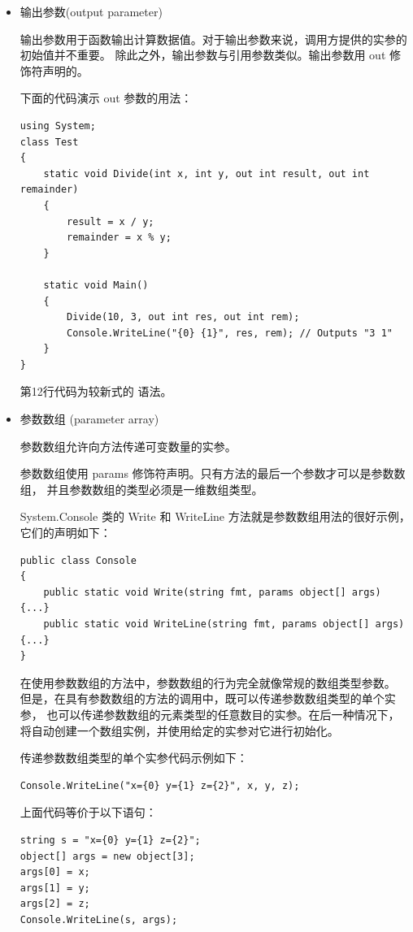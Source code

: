 \begin{itemize}
\begin{itemize}
              \item 输出参数(output parameter)

                    输出参数用于函数输出计算数据值。对于输出参数来说，调用方提供的实参的初始值并不重要。
                    除此之外，输出参数与引用参数类似。输出参数用 out 修饰符声明的。

                    下面的代码演示 out 参数的用法：

                    \begin{lstlisting}
using System;
class Test
{
    static void Divide(int x, int y, out int result, out int remainder) 
    {
        result = x / y;
        remainder = x % y;
    }

    static void Main() 
    {
        Divide(10, 3, out int res, out int rem);
        Console.WriteLine("{0} {1}", res, rem); // Outputs "3 1"
    }
}
\end{lstlisting}

                    第12行代码为较新式的 \cs 语法。

              \item 参数数组 (parameter array)

                    参数数组允许向方法传递可变数量的实参。

                    参数数组使用 params 修饰符声明。只有方法的最后一个参数才可以是参数数组，
                    并且参数数组的类型必须是一维数组类型。

                    System.Console 类的 Write 和 WriteLine 方法就是参数数组用法的很好示例，
                    它们的声明如下：

                    \begin{lstlisting}
public class Console
{
    public static void Write(string fmt, params object[] args) {...}
    public static void WriteLine(string fmt, params object[] args) {...}
}
\end{lstlisting}

                    在使用参数数组的方法中，参数数组的行为完全就像常规的数组类型参数。
                    但是，在具有参数数组的方法的调用中，既可以传递参数数组类型的单个实参，
                    也可以传递参数数组的元素类型的任意数目的实参。在后一种情况下，
                    将自动创建一个数组实例，并使用给定的实参对它进行初始化。

                    传递参数数组类型的单个实参代码示例如下：

                    \begin{lstlisting}
Console.WriteLine("x={0} y={1} z={2}", x, y, z);
\end{lstlisting}

                    上面代码等价于以下语句：

                    \begin{lstlisting}
string s = "x={0} y={1} z={2}";
object[] args = new object[3];
args[0] = x;
args[1] = y;
args[2] = z;
Console.WriteLine(s, args);
\end{lstlisting}

          \end{itemize}

\end{itemize}

